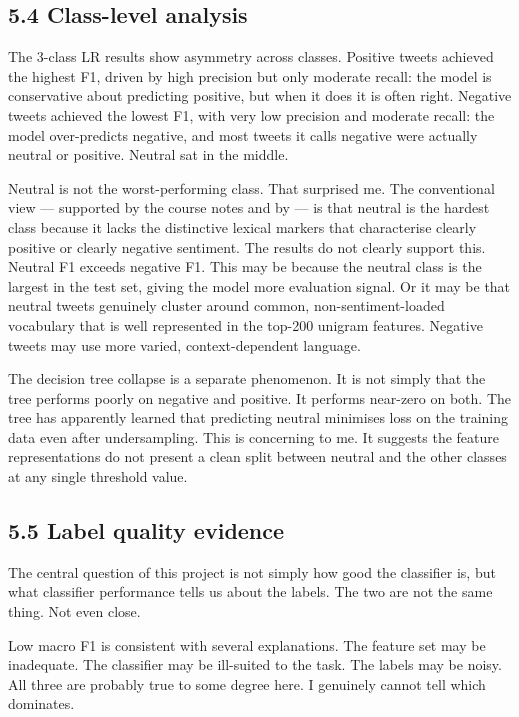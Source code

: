 \documentclass[12pt]{article}
\begin{document}
\subsection*{5.4 Class-level analysis}

The 3-class LR results show asymmetry across classes. Positive tweets achieved the highest F1, driven by high precision but only moderate recall: the model is conservative about predicting positive, but when it does it is often right. Negative tweets achieved the lowest F1, with very low precision and moderate recall: the model over-predicts negative, and most tweets it calls negative were actually neutral or positive. Neutral sat in the middle.

Neutral is not the worst-performing class. That surprised me. The conventional view --- supported by the course notes and by \citet{kenyondean2018sentiment} --- is that neutral is the hardest class because it lacks the distinctive lexical markers that characterise clearly positive or clearly negative sentiment. The results do not clearly support this. Neutral F1 exceeds negative F1. This may be because the neutral class is the largest in the test set, giving the model more evaluation signal. Or it may be that neutral tweets genuinely cluster around common, non-sentiment-loaded vocabulary that is well represented in the top-200 unigram features. Negative tweets may use more varied, context-dependent language.

The decision tree collapse is a separate phenomenon. It is not simply that the tree performs poorly on negative and positive. It performs near-zero on both. The tree has apparently learned that predicting neutral minimises loss on the training data even after undersampling. This is concerning to me. It suggests the feature representations do not present a clean split between neutral and the other classes at any single threshold value.

\subsection*{5.5 Label quality evidence}

The central question of this project is not simply how good the classifier is, but what classifier performance tells us about the labels. The two are not the same thing. Not even close.

Low macro F1 is consistent with several explanations. The feature set may be inadequate. The classifier may be ill-suited to the task. The labels may be noisy. All three are probably true to some degree here. I genuinely cannot tell which dominates.
\end{document}
